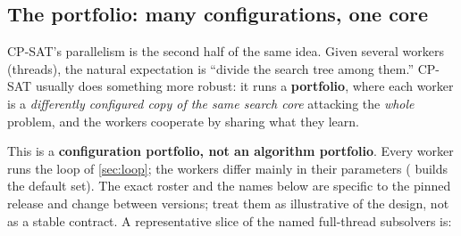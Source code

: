 \subsection{The portfolio: many configurations, one core}\label{sec:portfolio}

CP-SAT's parallelism is the second half of the same idea. Given several workers
(threads), the natural expectation is ``divide the search tree among them.''
CP-SAT usually does something more robust: it runs a \textbf{portfolio}, where
each worker is a \emph{differently configured copy of the same search core}
attacking the \emph{whole} problem, and the workers cooperate by sharing what
they learn.

This is a \textbf{configuration portfolio, not an algorithm portfolio}. Every
worker runs the loop of \cref{sec:loop}; the workers differ mainly in
their parameters ( builds the default set). The exact
roster and the names below are specific to the pinned release and change between
versions; treat them as illustrative of the design, not as a stable contract. A
representative slice of the named full-thread subsolvers is:


